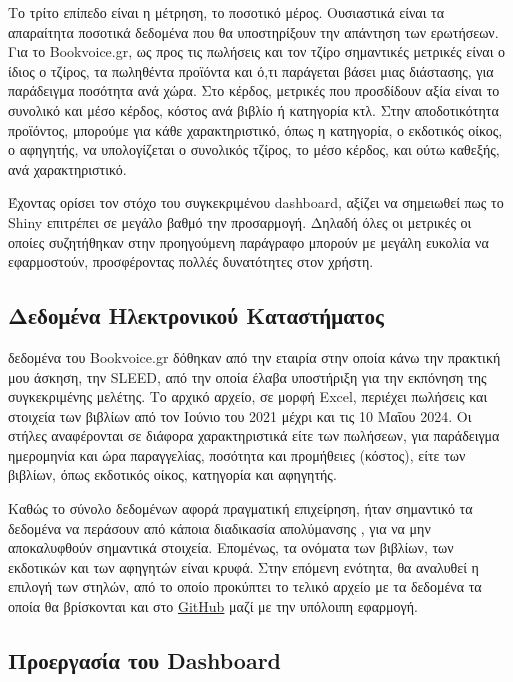 \documentclass[greek, 12pt]{article}
\begin{document}
Το τρίτο επίπεδο είναι η μέτρηση, το ποσοτικό μέρος. Ουσιαστικά είναι τα απαραίτητα ποσοτικά δεδομένα που θα υποστηρίξουν την απάντηση των ερωτήσεων. Για το Bookvoice.gr, ως προς τις πωλήσεις και τον τζίρο σημαντικές μετρικές είναι ο ίδιος ο τζίρος, τα πωληθέντα προϊόντα και ό,τι παράγεται βάσει μιας διάστασης, για παράδειγμα ποσότητα ανά χώρα. Στο κέρδος, μετρικές που προσδίδουν αξία είναι το συνολικό και μέσο κέρδος, κόστος ανά βιβλίο ή κατηγορία κτλ. Στην αποδοτικότητα προϊόντος, μπορούμε για κάθε χαρακτηριστικό, όπως η κατηγορία, ο εκδοτικός οίκος, ο αφηγητής, να υπολογίζεται ο συνολικός τζίρος, το μέσο κέρδος, και ούτω καθεξής, ανά χαρακτηριστικό.

Έχοντας ορίσει τον στόχο του συγκεκριμένου dashboard, αξίζει να σημειωθεί πως το Shiny επιτρέπει σε μεγάλο βαθμό την προσαρμογή. Δηλαδή όλες οι μετρικές οι οποίες συζητήθηκαν στην προηγούμενη παράγραφο μπορούν με μεγάλη ευκολία να εφαρμοστούν, προσφέροντας πολλές δυνατότητες στον χρήστη. 

\subsection{Δεδομένα Ηλεκτρονικού Καταστήματος}

 δεδομένα του Bookvoice.gr δόθηκαν από την εταιρία στην οποία κάνω την πρακτική μου άσκηση, την SLEED, από την οποία έλαβα υποστήριξη για την εκπόνηση της συγκεκριμένης μελέτης. Το αρχικό αρχείο, σε μορφή Excel, περιέχει πωλήσεις και στοιχεία των βιβλίων από τον Ιούνιο του 2021 μέχρι και τις 10 Μαΐου 2024. Οι στήλες αναφέρονται σε διάφορα χαρακτηριστικά είτε των πωλήσεων, για παράδειγμα ημερομηνία και ώρα παραγγελίας, ποσότητα και προμήθειες (κόστος), είτε των βιβλίων, όπως εκδοτικός οίκος, κατηγορία και αφηγητής.

Καθώς το σύνολο δεδομένων αφορά πραγματική επιχείρηση, ήταν σημαντικό τα δεδομένα να περάσουν από κάποια διαδικασία απολύμανσης \cite{atallah1999disclosure}, για να μην αποκαλυφθούν σημαντικά στοιχεία. Επομένως, τα ονόματα των βιβλίων, των εκδοτικών και των αφηγητών είναι κρυφά. Στην επόμενη ενότητα, θα αναλυθεί η επιλογή των στηλών, από το οποίο προκύπτει το τελικό αρχείο με τα δεδομένα τα οποία θα βρίσκονται και στο \href{https://github.com/kostas-rigan/r-shiny-dashboard-app}{GitHub} μαζί με την υπόλοιπη εφαρμογή.

\subsection{Προεργασία του Dashboard}
\end{document}
